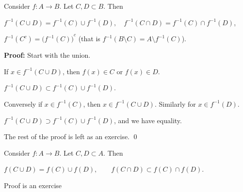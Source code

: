 \documentclass[10pt,aspectratio=149]{beamer}
\begin{document}
\begin{frame}


\begin{proposition}
Consider $f \colon A \to B$.  Let $C, D \subset B$.  \pause Then

\medskip
$f^{-1}( C \cup D) = f^{-1} (C) \cup f^{-1} (D) , \quad
f^{-1}( C \cap D) = f^{-1} (C) \cap f^{-1} (D)$,

\medskip
\pause
$f^{-1}( C^c) = {\bigl( f^{-1} (C) \bigr)}^c$
\quad
(that is $f^{-1}( B \setminus C) = A \setminus f^{-1} (C)$).
\end{proposition}

\pause
\textbf{Proof:}
Start with the union.

\pause
If $x \in f^{-1}( C \cup D)$, then $f(x) \in C$ or $f(x) \in D$.

\pause
\thus\quad  $f^{-1}( C \cup D) \subset f^{-1} (C) \cup f^{-1} (D)$.

\pause
Conversely if $x \in f^{-1}(C)$, then $x \in f^{-1}(C \cup D)$.
\pause
\quad Similarly for $x \in f^{-1}(D)$.

\pause

\thus \quad $f^{-1}( C \cup D) \supset f^{-1} (C) \cup f^{-1} (D)$, and we have
equality.

\medskip
\pause

The rest of the proof is left as an exercise.
\qed

\pause

\begin{proposition}
Consider $f \colon A \to B$.  Let $C, D \subset A$. \pause  Then

$f( C \cup D) = f (C) \cup f (D) , \qquad
f( C \cap D) \subset f (C) \cap f (D)$.
\end{proposition}

\pause
Proof is an exercise
\end{frame}
\end{document}

